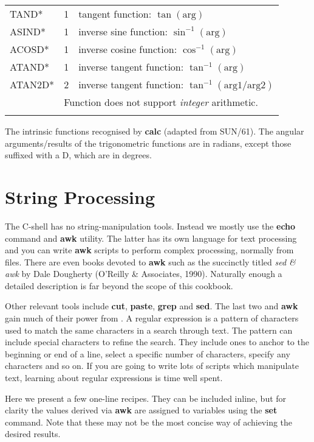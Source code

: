 \begin{center}
\begin{tabular}{lcl}
TAND* & 1 & tangent function: $\tan (\mbox{arg})$ \\
ASIND* & 1 & inverse sine function: $\sin ^{-1}(\mbox{arg})$ \\
ACOSD* & 1 & inverse cosine function: $\cos ^{-1}(\mbox{arg})$ \\
ATAND* & 1 & inverse tangent function: $\tan ^{-1}(\mbox{arg})$ \\
ATAN2D* & 2 & inverse tangent function: $\tan ^{-1}(\mbox{arg1/arg2})$ \\
\multicolumn{1}{r}{} &
\multicolumn{2}{l}{\footnotesize *Function does not support {\em integer}
arithmetic.}\\
\\ \hline
\end{tabular}
\end{center}
The intrinsic functions recognised by {\bf calc} (adapted from SUN/61).
The angular arguments/results of the trigonometric functions are in
radians, except those suffixed with a D, which are in degrees.
\label{sc4_table:intrinsics}

\newpage
\section{String Processing
\label{sc4_se_string_proc}}

The C-shell has no string-manipulation tools.  Instead we mostly use
the {\bf echo} command and {\bf awk} utility.  The latter has its own
language for text processing and you can write {\bf awk} scripts to
perform complex processing, normally from files.  There are even books
devoted to {\bf awk} such as the succinctly titled {\sl sed \& awk} by
Dale Dougherty (O'Reilly \& Associates, 1990).  Naturally enough a
detailed description is far beyond the scope of this cookbook.

Other relevant tools include {\bf cut}, {\bf paste}, {\bf grep} and
{\bf sed}.  The last two and {\bf awk} gain much of their power from
.  A regular expression
is a pattern of characters used to match the same characters in a
search through text.  The pattern can include special characters to
refine the search.  They include ones to anchor to the beginning or
end of a line, select a specific number of characters, specify any
characters and so on.  If you are going to write lots of scripts which
manipulate text, learning about regular expressions is time well
spent.

Here we present a few one-line recipes.  They can be included inline,
but for clarity the values derived via {\bf awk} are assigned to
variables using the {\bf set} command.  Note that these may not be the
most concise way of achieving the desired results.

